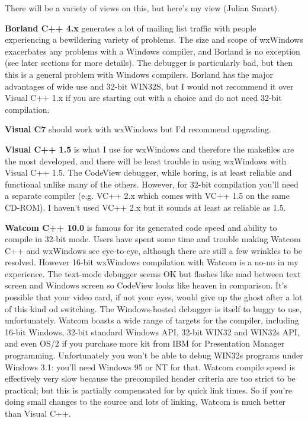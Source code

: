 There will be a variety of views on this, but here's my view (Julian Smart).

{\bf Borland C++ 4.x} generates a lot of mailing list traffic with people experiencing
a bewildering variety of problems. The size and scope of wxWindows exacerbates
any problems with a Windows compiler, and Borland is no exception (see later
sections for more details). The debugger is particularly bad, but then
this is a general problem with Windows compilers. Borland has the major advantages
of wide use and 32-bit WIN32S, but I would not recommend it over Visual C++ 1.x
if you are starting out with a choice and do not need 32-bit compilation.

{\bf Visual C7} should work with wxWindows but I'd recommend upgrading.

{\bf Visual C++ 1.5} is what I use for wxWindows and therefore the makefiles
are the most developed, and there will be least trouble in using wxWindows with
Visual C++ 1.5. The CodeView debugger, while boring, is at least reliable and
functional unlike many of the others. However, for 32-bit compilation you'll
need a separate compiler (e.g. VC++ 2.x which comes with VC++ 1.5 on the same
CD-ROM). I haven't used VC++ 2.x but it sounds at least as reliable as 1.5.

{\bf Watcom C++ 10.0} is famous for its generated code speed and ability
to compile in 32-bit mode. Users have spent some time and trouble making
Watcom C++ and wxWindows see eye-to-eye, although there are still a few
wrinkles to be resolved. However 16-bit wxWindows compilation with
Watcom is a no-no in my experience. The text-mode debugger seems OK but flashes like mad
between text screen and Windows screen so CodeView looks like heaven in
comparison. It's possible that your video card, if not your eyes, would
give up the ghost after a lot of this kind od switching. The Windows-hosted debugger
is itself to buggy to use, unfortunately. Watcom boasts a wide range
of targets for the compiler, including 16-bit Windows, 32-bit standard Windows API,
32-bit WIN32 and WIN32s API, and even OS/2 if you purchase more kit from
IBM for Presentation Manager programming. Unfortunately you won't be
able to debug WIN32s programs under Windows 3.1: you'll need Windows 95 or NT
for that. Watcom compile speed is effectively very slow because the precompiled
header criteria are too strict to be practical; but this is partially
compensated for by quick link times. So if you're doing small changes
to the source and lots of linking, Watcom is much better than Visual C++.

